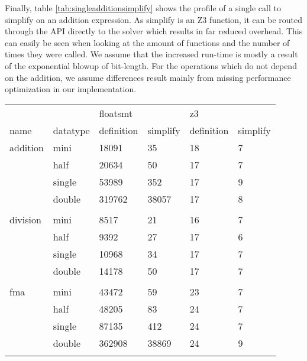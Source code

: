 \documentclass[a4paper,UKenglish,cleveref, autoref, thm-restate]{lipics-v2019}
\begin{document}
Finally, table \ref{tab:singleadditionsimplify} shows the profile of a single call to simplify on an addition expression. As simplify is an Z3 function, it can be routed through the API directly to the solver which results in far reduced overhead. This can easily be seen when looking at the amount of functions and the number of times they were called. We assume that the increased run-time is mostly a result of the exponential blowup of bit-length. For the operations which do not depend on the addition, we assume differences result mainly from missing performance optimization in our implementation.


\begin{center}	
	\begin{table}[]
		\begin{tabular}{ll|ll|ll}
			&          & floatsmt  &          & z3         &          \\
			name           & datatype & definition & simplify & definition & simplify \\ \hline
			addition       & mini     & 18091      & 35       & 18         & 7        \\
			& half     & 20634      & 50       & 17         & 7        \\
			& single   & 53989      & 352      & 17         & 9        \\
			& double   & 319762     & 38057    & 17         & 8        \\
			&          &            &          &            &          \\
			division       & mini     & 8517       & 21       & 16         & 7        \\
			& half     & 9392       & 27       & 17         & 6        \\
			& single   & 10968      & 34       & 17         & 7        \\
			& double   & 14178      & 50       & 17         & 7        \\
			&          &            &          &            &          \\
			fma            & mini     & 43472      & 59       & 23         & 7        \\
			& half     & 48205      & 83       & 24         & 7        \\
			& single   & 87135      & 412      & 24         & 7        \\
			& double   & 362908     & 38869    & 24         & 9        \\
			&          &            &          &            &          \\

\end{tabular}
\end{table}
\end{center}
\end{document}
